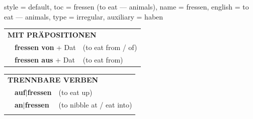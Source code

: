 \begin{verbentry}{
  style = {default},
  toc = {fressen (to eat — animals)},
  name = {fressen},
  english = {to eat — animals},
  type = {irregular},
  auxiliary = {haben}
}
   \vspace{10pt}

   \begin{tabular}{lll}
      \multicolumn{3}{l}{\textbf{MIT PRÄPOSITIONEN}}\\
& \textbf{fressen von} + Dat & (to eat from / of)\\
& \textbf{fressen aus} + Dat & (to eat from)\\
\end{tabular}
  \hfill
   \begin{tabular}{lll}
      \multicolumn{3}{l}{\textbf{TRENNBARE VERBEN}}\\
 & \textbf{auf$|$fressen} & (to eat up)\\
 & \textbf{an$|$fressen} & (to nibble at / eat into)\\
\vspace{10pt}
  \end{tabular}

  \vspace{-5pt}
\end{verbentry}

